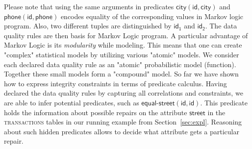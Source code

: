 Please note that using the same arguments in predicates $\mathsf{\textsf{city}(id, city)}$ and $\mathsf{\textsf{phone}(id, phone)}$ encodes equality of the corresponding values in Markov logic program. %
Also, two different tuples are distinguished by $\mathsf{id_1}$ and $\mathsf{id_2}$. 
The data quality rules are then basis for Markov Logic program. %
A particular advantage of Markov Logic is its \textit{modularity} while modeling. This means that one can create "complex" statistical models by utilizing various "atomic" models. We consider each declared data quality rule as an "atomic" probabilistic model (function). Together these small models form a "compound" model. 
So far we have shown how to express integrity constraints in terms of predicate calculus.
Having declared the data quality rules by capturing all correlations and constraints, we are able to infer potential predicates, such as $\mathsf{\textsf{equal-street}(id, id)}$. This predicate holds the information about possible repairs 
on the attribute $\mathsf{\textsf{street}}$ in the \textsc{transactions} tables in our running example from Section~\ref{sec:expl}.
Reasoning about such hidden predicates allows to decide what attribute gets a particular repair. 

